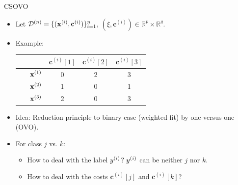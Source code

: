 \documentclass[10pt,compress,t,notes=noshow, xcolor=table]{beamer}
\newcommand{\cv}{\mathbf{c}}
\begin{document}
\begin{frame}{CSOVO}
    

    \begin{itemize}
        \item Let $\D^{(n)} = \{(\xi, \cv^{(i)})\}_{i=1}^n$, $(\xi, \cv^{(i)}) \in \mathbb{R}^p \times \mathbb{R}^g$.  
        \item Example:

        \begin{center}
            \begin{tabular}{cc|ccc}\
        	& & $\cv^{(i)}[1]$ & $\cv^{(i)}[2]$ & $\cv^{(i)}[3]$  \\
        	\hline & $\mathbf{x}^{(1)}$ & 0 & 2 & 3\\
        	& $\mathbf{x}^{(2)}$ & 1 & 0 & 1\\
                 & $\mathbf{x}^{(3)}$ & 2 & 0 & 3\\
            \end{tabular}
        \end{center}
        
        
        \item Idea: Reduction principle to binary case (weighted fit) by one-versus-one (OVO). 
        
        
        \item For class $j$ vs. $k$:
        \begin{itemize}
            \item How to deal with the label $y^{(i)}$? $y^{(i)}$ can be neither $j$ nor $k$.
            \vspace{5pt}
            
            \item How to deal with the costs $\cv^{(i)}[j]$ and $\cv^{(i)}[k]$?
            
        \end{itemize}
            
    \end{itemize}

\end{frame}
\end{document}
